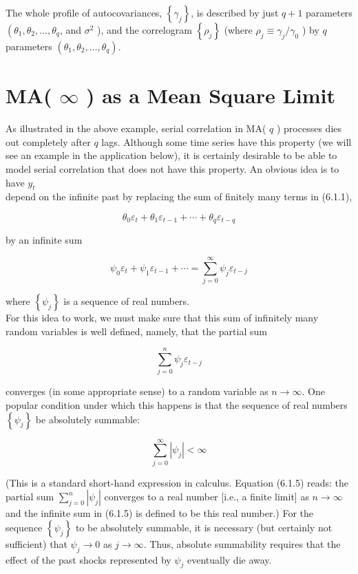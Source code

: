 \documentclass[10pt]{article}
\begin{document}
The whole profile of autocovariances, $\left\{\gamma_{j}\right\}$, is described by just $q+1$ parameters $\left(\theta_{1}, \theta_{2}, \ldots, \theta_{q}\right.$, and $\sigma^{2}$ ), and the correlogram $\left\{\rho_{j}\right\}$ (where $\rho_{j} \equiv \gamma_{j} / \gamma_{0}$ ) by $q$ parameters $\left(\theta_{1}, \theta_{2}, \ldots, \theta_{q}\right)$.

\section*{MA( $\infty$ ) as a Mean Square Limit}
As illustrated in the above example, serial correlation in MA( $q$ ) processes dies out completely after $q$ lags. Although some time series have this property (we will see an example in the application below), it is certainly desirable to be able to model serial correlation that does not have this property. An obvious idea is to have $y_{t}$\\
depend on the infinite past by replacing the sum of finitely many terms in (6.1.1),

$$
\theta_{0} \varepsilon_{t}+\theta_{1} \varepsilon_{t-1}+\cdots+\theta_{q} \varepsilon_{t-q}
$$

by an infinite sum


\begin{equation*}
\psi_{0} \varepsilon_{t}+\psi_{1} \varepsilon_{t-1}+\cdots=\sum_{j=0}^{\infty} \psi_{j} \varepsilon_{t-j} \tag{6.1.3}
\end{equation*}


where $\left\{\psi_{j}\right\}$ is a sequence of real numbers.\\
For this idea to work, we must make sure that this sum of infinitely many random variables is well defined, namely, that the partial sum


\begin{equation*}
\sum_{j=0}^{n} \psi_{j} \varepsilon_{t-j} \tag{6.1.4}
\end{equation*}


converges (in some appropriate sense) to a random variable as $n \rightarrow \infty$. One popular condition under which this happens is that the sequence of real numbers $\left\{\psi_{j}\right\}$ be absolutely summable:


\begin{equation*}
\sum_{j=0}^{\infty}\left|\psi_{j}\right|<\infty \tag{6.1.5}
\end{equation*}


(This is a standard short-hand expression in calculus. Equation (6.1.5) reads: the partial sum $\sum_{j=0}^{n}\left|\psi_{j}\right|$ converges to a real number [i.e., a finite limit] as $n \rightarrow \infty$ and the infinite sum in (6.1.5) is defined to be this real number.) For the sequence $\left\{\psi_{j}\right\}$ to be absolutely summable, it is necessary (but certainly not sufficient) that $\psi_{j} \rightarrow 0$ as $j \rightarrow \infty$. Thus, absolute summability requires that the effect of the past shocks represented by $\psi_{j}$ eventually die away.
\end{document}
